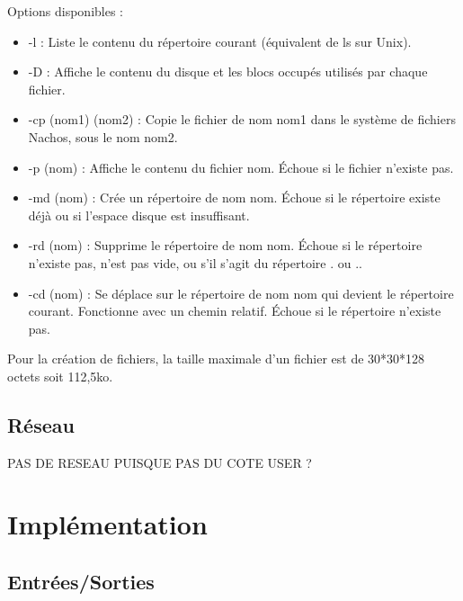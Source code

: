 \documentclass[12pt]{report}
\begin{document}
Options disponibles :\\
\begin{itemize}\renewcommand{\labelitemi}{$\bullet$}
\item -l  : Liste le contenu du répertoire courant (équivalent de ls sur Unix).
\item -D  : Affiche le contenu du disque et les blocs occupés utilisés par chaque fichier.
\item -cp (nom1) (nom2) : Copie le fichier de nom nom1 dans le système de fichiers Nachos, sous le nom nom2.
\item -p (nom) : Affiche le contenu du fichier nom. Échoue si le fichier n'existe pas.
\item -md (nom) : Crée un répertoire de nom nom. Échoue si le répertoire existe déjà ou si l'espace disque est insuffisant.
\item -rd (nom) : Supprime le répertoire de nom nom. Échoue si le répertoire n'existe pas, n'est pas vide, ou s'il s'agit du répertoire . ou ..
\item -cd (nom) : Se déplace sur le répertoire de nom nom qui devient le répertoire courant. Fonctionne avec un chemin relatif. Échoue si le répertoire n'existe pas.
\end{itemize}









Pour la création de fichiers, la taille maximale d'un fichier est de 30*30*128 octets soit 112,5ko.







\section{Réseau}
\color{red}PAS DE RESEAU PUISQUE PAS DU COTE USER ?\color{black}



\chapter{Implémentation}




\section{Entrées/Sorties}
\end{document}
